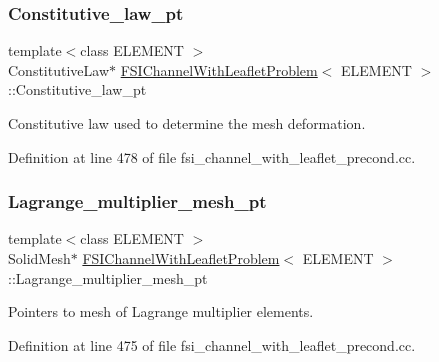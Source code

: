 \subsubsection{\texorpdfstring{Constitutive\+\_\+law\+\_\+pt}{Constitutive\_law\_pt}}
{\footnotesize\ttfamily template$<$class E\+L\+E\+M\+E\+NT $>$ \\
Constitutive\+Law$\ast$ \hyperlink{classFSIChannelWithLeafletProblem}{F\+S\+I\+Channel\+With\+Leaflet\+Problem}$<$ E\+L\+E\+M\+E\+NT $>$\+::Constitutive\+\_\+law\+\_\+pt\hspace{0.3cm}{\ttfamily [private]}}



Constitutive law used to determine the mesh deformation. 



Definition at line 478 of file fsi\+\_\+channel\+\_\+with\+\_\+leaflet\+\_\+precond.\+cc.

\mbox{\label{classFSIChannelWithLeafletProblem_aab28704c88d14a2f0975ffcdfbe913e4}} 
\subsubsection{\texorpdfstring{Lagrange\+\_\+multiplier\+\_\+mesh\+\_\+pt}{Lagrange\_multiplier\_mesh\_pt}}
{\footnotesize\ttfamily template$<$class E\+L\+E\+M\+E\+NT $>$ \\
Solid\+Mesh$\ast$ \hyperlink{classFSIChannelWithLeafletProblem}{F\+S\+I\+Channel\+With\+Leaflet\+Problem}$<$ E\+L\+E\+M\+E\+NT $>$\+::Lagrange\+\_\+multiplier\+\_\+mesh\+\_\+pt\hspace{0.3cm}{\ttfamily [private]}}



Pointers to mesh of Lagrange multiplier elements. 



Definition at line 475 of file fsi\+\_\+channel\+\_\+with\+\_\+leaflet\+\_\+precond.\+cc.

\mbox{\label{classFSIChannelWithLeafletProblem_adb1d2ebc1379fac8b99cc61379d2b211}} 
